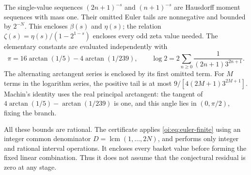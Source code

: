 The single-value sequences $(2n+1)^{-s}$ and $(n+1)^{-s}$ are
Hausdorff moment sequences with mass one.  Their omitted Euler tails
are nonnegative and bounded by $2^{-N}$.  This encloses $\beta(s)$
and $\eta(s)$; the relation
$\zeta(s)=\eta(s)/(1-2^{1-s})$ encloses every odd zeta value needed.
The elementary constants are evaluated independently with
\[
 \pi=16\arctan(1/5)-4\arctan(1/239),\qquad
 \log2=2\sum_{n\geq0}\frac1{(2n+1)3^{2n+1}}.
\]
The alternating arctangent series is enclosed by its first omitted
term.  For $M$ terms in the logarithm series, the positive tail is at
most $9/[4(2M+1)3^{2M+1}]$.  Machin's identity uses the real principal
arctangent: the tangent of $4\arctan(1/5)-\arctan(1/239)$ is one,
and this angle lies in $(0,\pi/2)$, fixing the branch.

All these bounds are rational.  The certificate applies
\eqref{oi:eq:euler-finite} using an integer common denominator
$D=\operatorname{lcm}(1,\ldots,2N)$, and performs only integer and
rational interval operations.  It encloses every basket value before
forming the fixed linear combination.  Thus it does not assume that
the conjectural residual is zero at any stage.

